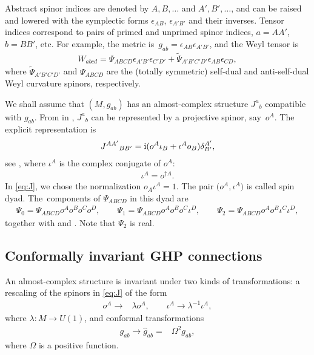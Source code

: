 \documentclass[pdftex]{sigma}
\numberwithin{equation}{section}
\begin{document}
Abstract spinor indices are denoted by $A,B,\dots $ and $A',B',\dots $, and can be raised and lowered with the symplectic forms $\epsilon_{AB}$, $\epsilon_{A'B'}$ and their inverses. Tensor indices correspond to pairs of primed and unprimed spinor indices, $a=AA'$, $b=BB'$, etc. For example, the metric is~${g_{ab}=\epsilon_{AB}\epsilon_{A'B'}}$, and the Weyl tensor is
\begin{align*}%
 W_{abcd} = \Psi_{ABCD}\epsilon_{A'B'}\epsilon_{C'D'} + \tilde\Psi_{A'B'C'D'}\epsilon_{AB}\epsilon_{CD},
\end{align*}
where $\tilde\Psi_{A'B'C'D'}$ and $\Psi_{ABCD}$ are the (totally symmetric) self-dual and anti-self-dual Weyl curvature spinors, respectively.

We shall assume that $(M,g_{ab})$ has an almost-complex structure $J^{a}{}_{b}$ compatible with $g_{ab}$. From in \cite[Chapter~IV, Proposition~9.8]{lawson:michelsohn},
$J^{a}{}_{b}$ can be represented by a projective spinor, say~$o^{A}$. The explicit representation is
\begin{align}\label{eq:J}
 J^{AA'}{}_{BB'} = {\rm i} (o^{A}\iota_{B}+\iota^{A}o_{B})\delta^{A'}_{B'},
\end{align}
see \cite[equation~(4.7)]{Woodhouse_1985}, where $\iota^{A}$ is the complex conjugate of $o^{A}$:
\begin{align}\label{iota}
 \iota^A = o^{\dagger A}.
\end{align}
In \eqref{eq:J}, we chose the normalization $o_{A}\iota^{A}=1$. The pair $\bigl(o^A,\iota^A\bigr)$ is called spin dyad. The~components of $\Psi_{ABCD}$ in this dyad are
\begin{align}\label{weylspinorcomp}
\Psi_0 = \Psi_{ABCD} o^A o^B o^C o^D, \qquad \Psi_1 = \Psi_{ABCD} o^A o^B o^C \iota^D, \qquad \Psi_2 = \Psi_{ABCD} o^A o^B \iota^C \iota^D,
\end{align}
together with  and . Note that $\Psi_2$ is real.


\subsection{Conformally invariant GHP connections} \label{sec:CGHP}

An almost-complex structure is invariant under two kinds of transformations: a rescaling of the spinors in \eqref{eq:J} of the form
\begin{align}\label{GHPscaling}
o^A \to{}& \lambda o^A, \qquad \iota^A \to \lambda^{-1} \iota^A,
\end{align}
where $\lambda\colon M\to U(1)$, and conformal transformations
\begin{align}\label{conformaltmetric}
g_{ab} \to \hat g_{ab} ={}& \Omega^2 g_{ab},
\end{align}
where $\Omega$ is a positive function.
\end{document}
